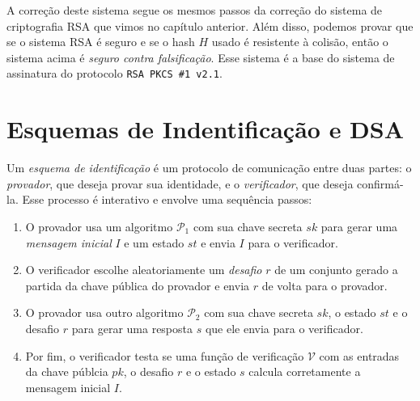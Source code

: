 A correção deste sistema segue os mesmos passos da correção do sistema de criptografia RSA que vimos no capítulo anterior.
Além disso, podemos provar que se o sistema RSA é seguro e se o hash $H$ usado é resistente à colisão, então o sistema acima é {\em seguro contra falsificação}.
Esse sistema é a base do sistema de assinatura do protocolo \texttt{RSA PKCS \#1 v2.1}.

\section{Esquemas de Indentificação e DSA}
\label{sec:dsa}

Um {\em esquema de identificação} é um protocolo de comunicação entre duas partes:
o {\em provador}, que deseja provar sua identidade, e o {\em verificador}, que deseja confirmá-la.
Esse processo é interativo e envolve uma sequência passos:

\begin{enumerate}
\item O provador usa um algoritmo $\mathcal{P}_1$ com sua chave secreta $sk$ para gerar uma {\em mensagem inicial} $I$ e um estado $st$ e envia $I$ para o verificador.
\item O verificador escolhe aleatoriamente um {\em desafio} $r$ de um conjunto gerado a partida da chave pública do provador e envia $r$ de volta para o provador.
\item O provador usa outro algoritmo $\mathcal{P}_2$ com sua chave secreta $sk$, o estado $st$ e o desafio $r$ para gerar uma resposta $s$ que ele envia para o verificador.
\item Por fim, o verificador testa se uma função de verificação $\mathcal{V}$ com as entradas da chave públcia $pk$, o desafio $r$ e o estado $s$ calcula corretamente a mensagem inicial $I$.
\end{enumerate}

\begin{center}
\end{center}

